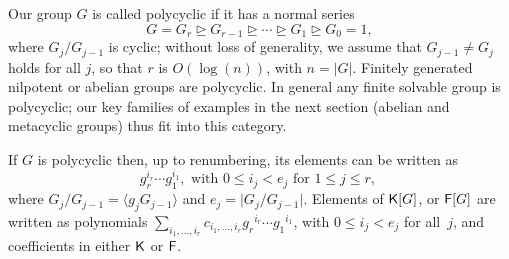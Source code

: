 Our group $G$ is called polycyclic if it has a normal series
$$G = G_{r} \unrhd G_{r-1} \unrhd \cdots \unrhd G_1 \unrhd G_{0} =
1,$$ where $G_{j}/G_{j-1}$ is cyclic; without loss of generality, we
assume that $G_{j-1 } \ne G_{j}$ holds for all $j$, so that $r$ is
$O(\log(n))$, with $n=|G|$. Finitely generated nilpotent or abelian
groups are polycyclic. In general any finite solvable group is
polycyclic; our key families of examples in the next section (abelian
and metacyclic groups) thus fit into this category.

If $G$ is polycyclic then, up to renumbering, its 
elements can be written as
\[\label{eq:polycyclicgrp}
g_r^{i_r} \cdots g_1^{i_1}, \text{~with~} 0 \leq i_j < e_j
\text{~for~} 1 \leq j \leq r,\
\]
where $G_{j}/G_{j-1} = \langle g_{j}G_{j-1} \rangle$ and $e_j=\vert
G_{j}/G_{j-1}\vert$. Elements of ${\mathsf{K}}[G]$, or ${\mathsf{F}}[G]$ are written as
polynomials $\sum_{i_1,\dots,i_r} c_{i_1,\dots,i_r} {g_r}^{i_r} \cdots
{g_1}^{i_1}$, with $0\le i_j < e_j$ for all~$j$, and coefficients 
in either ${\mathsf{K}}$ or ${\mathsf{F}}$.



